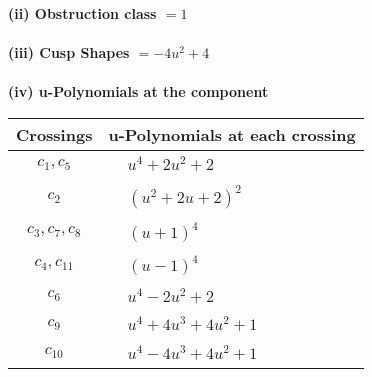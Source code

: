 \documentclass[1p]{elsarticle_modified}
\theoremstyle{definition}
\begin{document}
\flushleft \textbf{(ii) Obstruction class $= 1$}\\~\\
\flushleft \textbf{(iii) Cusp Shapes $= -4 u^2+4$}\\~\\
\newpage\renewcommand{\arraystretch}{1}
\flushleft \textbf{(iv) u-Polynomials at the component}\newline \\
\begin{tabular}{m{50pt}|m{274pt}}
Crossings & \hspace{64pt}u-Polynomials at each crossing \\
\hline $$\begin{aligned}c_{1},c_{5}\end{aligned}$$&$\begin{aligned}
&u^4+2 u^2+2
\end{aligned}$\\
\hline $$\begin{aligned}c_{2}\end{aligned}$$&$\begin{aligned}
&(u^2+2 u+2)^2
\end{aligned}$\\
\hline $$\begin{aligned}c_{3},c_{7},c_{8}\end{aligned}$$&$\begin{aligned}
&(u+1)^4
\end{aligned}$\\
\hline $$\begin{aligned}c_{4},c_{11}\end{aligned}$$&$\begin{aligned}
&(u-1)^4
\end{aligned}$\\
\hline $$\begin{aligned}c_{6}\end{aligned}$$&$\begin{aligned}
&u^4-2 u^2+2
\end{aligned}$\\
\hline $$\begin{aligned}c_{9}\end{aligned}$$&$\begin{aligned}
&u^4+4 u^3+4 u^2+1
\end{aligned}$\\
\hline $$\begin{aligned}c_{10}\end{aligned}$$&$\begin{aligned}
&u^4-4 u^3+4 u^2+1
\end{aligned}$\\
\hline
\end{tabular}\\~\\
\end{document}
